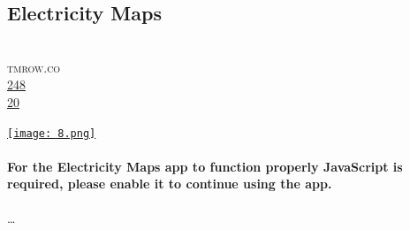 \documentclass[10pt,a4paper]{article}
\begin{document}
\subsection{Electricity Maps}
\noindent\begin{minipage}[t]{0.19\linewidth}
\vspace{0pt}
\noindent\scshape\footnotesize
\\ {\scriptsize\faGlobe}\space 
tmrow.co
\\ {\scriptsize\faThumbsOUp}\space 
\href{http://news.ycombinator.com/item?id=37197903\&utm\_term=comment}{248} 
\\ {\scriptsize\faComments}\space 
\href{http://news.ycombinator.com/item?id=37197903\&utm\_term=comment}{20} 
\end{minipage} 
\begin{minipage}[t]{0.80\linewidth}
\vspace{0pt}
\begin{multicols}{2}
    \href{https://app.electricitymaps.com?utm\_source=hackernewsletter\&utm\_medium=email\&utm\_term=fav}{
        \texttt{[image: 8.png]}
    }
\paragraph{For the Electricity Maps app to function properly JavaScript is required, please enable it to continue using the app.}

\dots
\end{multicols}
\end{minipage}
\par\medskip
\end{document}
